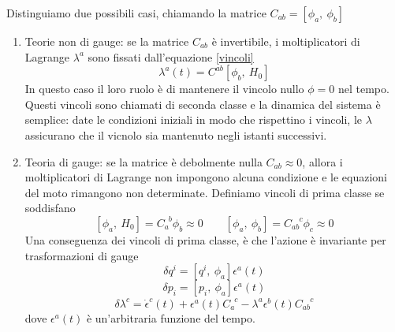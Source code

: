    Distinguiamo due possibili casi, chiamando la matrice $C_{ab} = [\phi_a, ~\phi_b]$
\begin{enumerate}
    \item Teorie non di gauge: se la matrice $C_{ab}$ è invertibile, i moltiplicatori di Lagrange $\lambda^a$ sono fissati dall'equazione \eqref{vincoli}
\begin{equation}
    \lambda^a (t) = C^{ab} [\phi_b, ~H_0]
\end{equation}
    In questo caso il loro ruolo è di mantenere il vincolo nullo $\phi = 0$ nel tempo. Questi vincoli sono chiamati di seconda classe e la dinamica del sistema è semplice: date le condizioni iniziali in modo che rispettino i vincoli, le $\lambda$ assicurano che il vicnolo sia mantenuto negli istanti successivi.
    \item Teoria di gauge: se la matrice è debolmente nulla $C_{ab} \approx 0$, allora i moltiplicatori di Lagrange non impongono alcuna condizione e le equazioni del moto rimangono non determinate. Definiamo vincoli di prima classe se soddisfano 
\begin{equation} \label{secondaclasse}
    [\phi_a, ~ H_0] = C_a^{\phantom a b} \phi_b \approx 0 \qquad   [\phi_a, ~ \phi_b] = C_{ab}^{\phantom{ab} c} \phi_c \approx 0
\end{equation}
    Una conseguenza dei vincoli di prima classe, è che l'azione è invariante per trasformazioni di gauge 
\begin{equation}
    \delta q^i = [q^i, ~\phi_a] \epsilon^a (t)
\end{equation}
\begin{equation}
    \delta p_i = [p_i, ~\phi_a] \epsilon^a (t)
\end{equation}
\begin{equation}
    \delta \lambda^c = \dot \epsilon^c (t) + \epsilon^a(t) C_a^{\phantom a c} - \lambda^a \epsilon^b(t) C_{ab}^{\phantom{ab} c}
\end{equation}
    dove $\epsilon^a(t)$ è un'arbitraria funzione del tempo. 
\end{enumerate}


